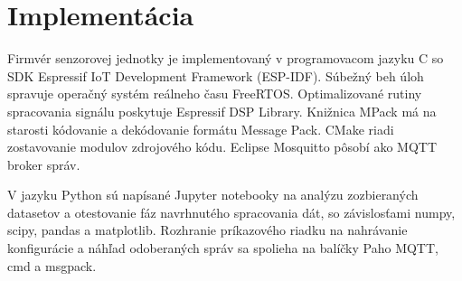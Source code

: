 \chapter{Implementácia} \label{chapter:implementation}
Firmvér senzorovej jednotky je implementovaný v programovacom jazyku C so
SDK Espressif IoT Development Framework (ESP-IDF). Súbežný beh úloh spravuje operačný systém reálneho času FreeRTOS.
Optimalizované rutiny spracovania signálu poskytuje Espressif DSP Library. Knižnica MPack má na starosti
kódovanie a dekódovanie formátu Message Pack. CMake riadi zostavovanie
modulov zdrojového kódu. Eclipse Mosquitto pôsobí ako MQTT broker správ.

V jazyku Python sú napísané Jupyter notebooky na analýzu zozbieraných datasetov a otestovanie fáz navrhnutého spracovania dát,
so závislosťami numpy, scipy, pandas a matplotlib. Rozhranie príkazového riadku na nahrávanie konfigurácie a náhľad odoberaných
správ sa spolieha na balíčky Paho MQTT, cmd a msgpack.

